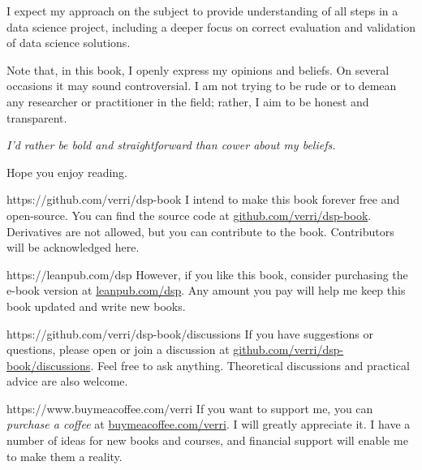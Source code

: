 I expect my approach on the subject to provide understanding of all steps in a data
science project, including a deeper focus on correct evaluation and validation of data
science solutions.

Note that, in this book, I openly express my opinions and beliefs. On several occasions it
may sound controversial.  I am not trying to be rude or to demean any researcher or
practitioner in the field; rather, I aim to be honest and transparent.

\vspace{1em}
\emph{I'd rather be bold and straightforward than cower about my beliefs.}
\vspace{1em}

Hope you enjoy reading.

\newpage

\begin{parwithqr}{https://github.com/verri/dsp-book}
  I intend to make this book forever free and open-source. You can find the source code at
  \href{\aurl}{github.com/verri/dsp-book}. Derivatives are not allowed, but you can
  contribute to the book. Contributors will be acknowledged here.
\end{parwithqr}

\vspace{3em}

\begin{lparwithqr}{https://leanpub.com/dsp}
  However, if you like this book, consider purchasing the e-book version at
  \href{\aurl}{leanpub.com/dsp}. Any amount you pay will help me keep this book updated
  and write new books.
\end{lparwithqr}

\vspace{3em}

\begin{parwithqr}{https://github.com/verri/dsp-book/discussions}
  If you have suggestions or questions, please open or join a discussion at
  \href{\aurl}{github.com/verri/dsp-book/discussions}. Feel free to ask anything.
  Theoretical discussions and practical advice are also welcome.
\end{parwithqr}

\vspace{3em}

\begin{lparwithqr}{https://www.buymeacoffee.com/verri}
  If you want to support me, you can \emph{purchase a coffee} at
  \href{\aurl}{buymeacoffee.com/verri}. I will greatly appreciate it.  I have a number of
  ideas for new books and courses, and financial support will enable me to make them a
  reality.
\end{lparwithqr}

